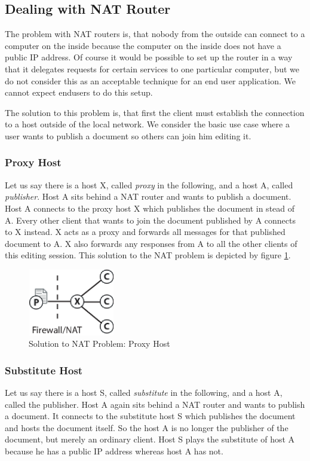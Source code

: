 \documentclass[11pt,a4paper]{article}
\begin{document}
\subsection{Dealing with NAT Router}
The problem with NAT routers is, that nobody from the outside can connect to a computer on the inside because the computer on the inside does not have a public IP address. Of course it would be possible to set up the router in a way that it delegates requests for certain services to one particular computer, but we do not consider this as an acceptable technique for an end user application. We cannot expect endusers to do this setup.

The solution to this problem is, that first the client must establish the connection to a host outside of the local network. We consider the basic use case where a user wants to publish a document so others can join him editing it. 

\subsubsection{Proxy Host}
Let us say there is a host X, called \emph{proxy} in the following, and a host A, called \emph{publisher}. Host A sits behind a NAT router and wants to publish a document. Host A connects to the proxy host X which publishes the document in stead of A. Every other client that wants to join the document published by A connects to X instead. X acts as a proxy and forwards all messages for that published document to A. X also forwards any responses from A to all the other clients of this editing session. This solution to the NAT problem is depicted by figure \ref{fig:proxy}.

\begin{figure}[H]
 \centering
 \includegraphics[width=3.8cm,height=2.9cm]{../../images/net_proxy.eps}
 \caption{Solution to NAT Problem: Proxy Host}
 \label{fig:proxy}
\end{figure}

\subsubsection{Substitute Host}
Let us say there is a host S, called \emph{substitute} in the following, and a host A, called the publisher. Host A again sits behind a NAT router and wants to publish a document. It connects to the substitute host S which publishes the document and hosts the document itself. So the host A is no longer the publisher of the document, but merely an ordinary client. Host S plays the substitute of host A because he has a public IP address whereas host A has not.
\end{document}
